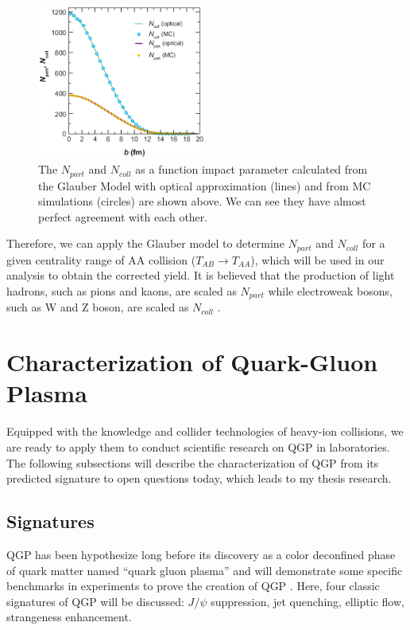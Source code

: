 \begin{figure}[hbtp]
\begin{center}
\includegraphics[width=0.50\textwidth]{Figures/Chapter1/NPartandNColl.png}
\caption{The $N_{part}$ and $N_{coll}$ as a function impact parameter calculated from the Glauber Model with optical approximation (lines) and from MC simulations (circles) are shown above. We can see they have almost perfect agreement with each other.}
\label{NPartandNColl}
\end{center}
\end{figure} 


Therefore, we can apply the Glauber model to determine $N_{part}$ and $N_{coll}$ for a given centrality range of AA collision ($T_{AB} \rightarrow T_{AA}$), which will be used in our analysis to obtain the corrected yield. It is believed that the production of light hadrons, such as pions and kaons, are scaled as $N_{part}$ \cite{NPartScaling} while electroweak bosons, such as W and Z boson, are scaled as $N_{coll}$ \cite{NCollScaling}.

\section{Characterization of Quark-Gluon Plasma}

Equipped with the knowledge and collider technologies of heavy-ion collisions, we are ready to apply them to conduct scientific research on QGP in laboratories. The following subsections will describe the characterization of QGP from its predicted signature to open questions today, which leads to my thesis research.

\subsection{Signatures}

QGP has been hypothesize long before its discovery as a color deconfined phase of quark matter named ``quark gluon plasma'' \cite{LeonQGP} and will demonstrate some specific benchmarks in experiments to prove the creation of QGP \cite{QGPSignature}. Here, four classic signatures of QGP will be discussed: $J/\psi$ suppression, jet quenching, elliptic flow, strangeness enhancement.  

